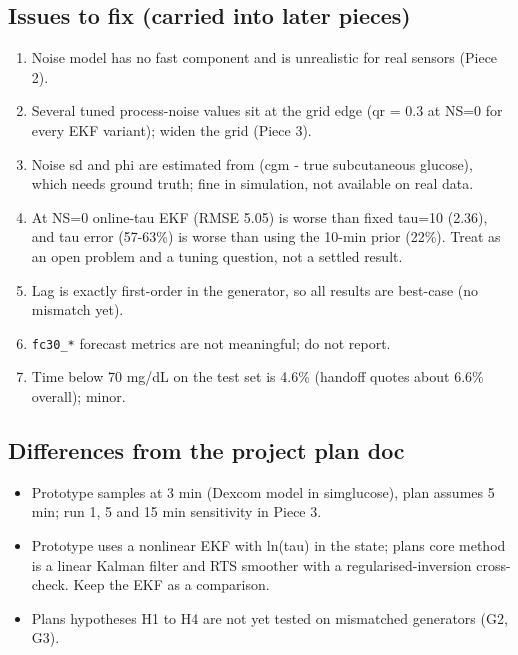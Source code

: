 \documentclass[11pt,a4paper]{article}
\providecommand{\tightlist}{\setlength{\itemsep}{0pt}\setlength{\parskip}{0pt}}
\begin{document}
\hypertarget{issues-to-fix-carried-into-later-pieces}{%
\subsection{Issues to fix (carried into later
pieces)}\label{issues-to-fix-carried-into-later-pieces}}

\begin{enumerate}
\def\labelenumi{\arabic{enumi}.}
\tightlist
\item
  Noise model has no fast component and is unrealistic for real sensors
  (Piece 2).
\item
  Several tuned process-noise values sit at the grid edge (qr = 0.3 at
  NS=0 for every EKF variant); widen the grid (Piece 3).
\item
  Noise sd and phi are estimated from (cgm - true subcutaneous glucose),
  which needs ground truth; fine in simulation, not available on real
  data.
\item
  At NS=0 online-tau EKF (RMSE 5.05) is worse than fixed tau=10 (2.36),
  and tau error (57-63\%) is worse than using the 10-min prior (22\%).
  Treat as an open problem and a tuning question, not a settled result.
\item
  Lag is exactly first-order in the generator, so all results are
  best-case (no mismatch yet).
\item
  \texttt{fc30\_*} forecast metrics are not meaningful; do not report.
\item
  Time below 70 mg/dL on the test set is 4.6\% (handoff quotes about
  6.6\% overall); minor.
\end{enumerate}

\hypertarget{differences-from-the-project-plan-doc}{%
\subsection{Differences from the project plan
doc}\label{differences-from-the-project-plan-doc}}

\begin{itemize}
\tightlist
\item
  Prototype samples at 3 min (Dexcom model in simglucose), plan assumes
  5 min; run 1, 5 and 15 min sensitivity in Piece 3.
\item
  Prototype uses a nonlinear EKF with ln(tau) in the state;
  plan\textquotesingle s core method is a linear Kalman filter and RTS
  smoother with a regularised-inversion cross-check. Keep the EKF as a
  comparison.
\item
  Plan\textquotesingle s hypotheses H1 to H4 are not yet tested on
  mismatched generators (G2, G3).
\end{itemize}
\end{document}
